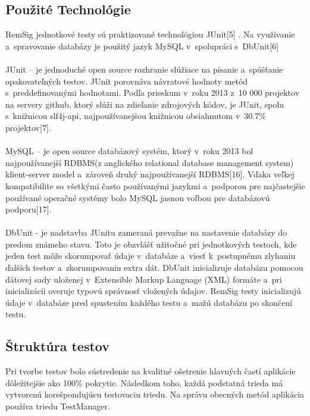 \documentclass[
  digital, %
  table,   %
oneside,
  nolof,     %
  nolot,     %
]{fithesis3}
\begin{document}
\subsection{Použité Technológie}
RemSig jednotkové testy sú praktizované technológiou  JUnit[5] . Na využívanie a~spravovanie databázy je použitý jazyk MySQL v~spolupráci s~DbUnit[6]\paragraph{}
JUnit – je jednoduché open source rozhranie slúžiace na písanie a~spúšťanie opakovateľných testov. JUnit porovnáva návratové hodnoty metód s~preddefinovanými hodnotami. Podľa prieskum v~roku 2013 z~10 000 projektov na servery github, ktorý slúži na zdieľanie zdrojových kódov, je JUnit, spolu s~knižnicou slf4j-api, najpoužívanejšou knižnicou obsiahnutom v~30.7\% projektov[7]. \paragraph{}
MySQL – je open source databázový systém, ktorý  v~roku 2013 bol najpoužívanejší RDBMS(z anglického relational database management system) klient-server model a~zároveň druhý najpoužívanejší RDBMS[16]. Vďaka veľkej kompatibilite so všetkými často používanými jazykmi a~podporou pre najčastejšie používané operačné systémy bolo MySQL jasnou voľbou pre databázovú podporu[17].\paragraph{}
DbUnit -  je nadstavba JUnitu zameraná prevažne na nastavenie databázy do predom známeho stavu. Toto je obzvlášť užitočné pri jednotkových testoch, kde jeden test môže skorumpovať údaje v~databáze a~viesť k~postupnému zlyhaniu ďalších  testov a~zkorumpovaniu extra dát. DbUnit inicializuje databázu pomocou  dátovej sady uloženej v~Extensible Markup Language (XML) formáte a~pri inicializácii overuje typovú správnosť vložených údajov. RemSig testy inicializujú údaje v~databáze pred  spustením  každého testu a~mažú databázu po skončení testu.  

\subsection{Štruktúra testov}
Pri tvorbe testov bolo sústredenie na kvalitné ošetrenie hlavných častí aplikácie dôležitejšie ako 100\% pokrytie. Následkom toho, každá podstatná trieda má vytvorenú korešpondujúcu testovaciu triedu. Na správu obecných metód aplikácia používa triedu TestManager. 
\end{document}
